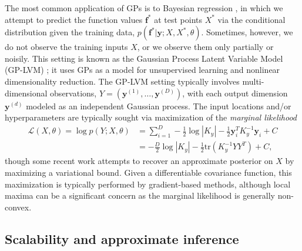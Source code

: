 \documentclass{article}
\newcommand{\tr}{\text{tr}}
\renewcommand{\v}[1]{\mathbf{#1}}
\begin{document}
The most common application of GPs is to Bayesian regression
\cite{rasmussen2006}, in which we attempt to predict the
function values $\v{f}^*$ at test points $X^*$ via the conditional
distribution given the training
data, $p(\v{f}^* | \v{y}; X, X^*, \theta)$. Sometimes, however, we do not observe the training inputs $X$,
or we observe them only partially or noisily. This setting is known as the Gaussian Process
Latent Variable Model (GP-LVM)  \cite{lawrence2004gaussian}; it uses
GPs as a model for unsupervised
  learning and nonlinear dimensionality reduction. The GP-LVM
  setting typically involves multi-dimensional observations, $Y = (\v{y}^{(1)}, \ldots,
  \v{y}^{(D)})$, with each output dimension $\v{y}^{(d)}$ modeled as an
  independent Gaussian process. The input locations and/or hyperparameters are typically sought via maximization of the {\em marginal likelihood}
\begin{align}
\mathcal{L}(X, \theta) = \log p(Y ; X, \theta) &= \sum_{i=1}^D -\frac{1}{2}\log |K_y| - \frac{1}{2} \v{y}_i^T K_y^{-1} \v{y}_i + C\nonumber\\
&= -\frac{D}{2}\log |K_y| - \frac{1}{2}\tr(K_y^{-1} YY^T) + C,\label{eqn:mlik}
\end{align}
though some recent work \citep{titsias2010bayesian,
  damianou2014} attempts to recover an
approximate posterior on $X$ by maximizing a variational bound. Given a
differentiable covariance function, this
maximization is typically performed by gradient-based methods, 
although local maxima can be a significant concern as
the marginal likelihood is generally non-convex.

\subsection{Scalability and approximate inference}
\label{sec:approx}
\end{document}
